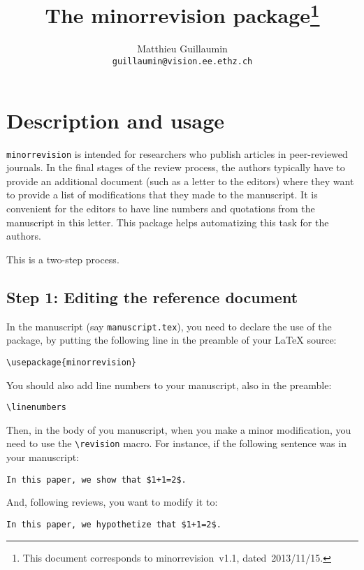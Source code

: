 \documentclass{ltxdoc}
\begin{document}
\title{The \textsf{minorrevision} package\thanks{This document corresponds to \textsf{minorrevision}~v1.1, dated~2013/11/15.}}
\author{Matthieu Guillaumin\\ \texttt{guillaumin@vision.ee.ethz.ch}}

\maketitle

\tableofcontents

\section{Description and usage}

\verb|minorrevision| is intended for researchers who publish articles in peer-reviewed
journals. In the final stages of the review process, the authors typically have
to provide an additional document (such as a letter to the editors) where they
want to provide a list of modifications that they made to the manuscript.  It
is convenient for the editors to have line numbers and quotations from the
manuscript in this letter. This package helps automatizing this task for the
authors.

This is a two-step process.

\subsection{Step 1: Editing the reference document}
In the manuscript (say \verb|manuscript.tex|), you need to declare the use
of the package, by putting the following line in the preamble of your LaTeX
source:
\begin{verbatim}
\usepackage{minorrevision}
\end{verbatim}

You should also add line numbers to your manuscript, also in the preamble:
\begin{verbatim}
\linenumbers
\end{verbatim}

Then, in the body of you manuscript, when you make a minor
modification, you need to use the \verb|\revision| macro. For instance, if the
following sentence was in your manuscript:
\begin{verbatim}
In this paper, we show that $1+1=2$.
\end{verbatim}

And, following reviews, you want to modify it to:
\begin{verbatim}
In this paper, we hypothetize that $1+1=2$.
\end{verbatim}
\end{document}
